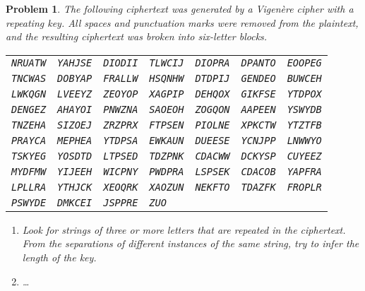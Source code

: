 \documentclass[12pt]{article}
\newtheorem{problem}{Problem}
\theoremstyle{remark}  %
\begin{document}
    \begin{problem}
    The following ciphertext was generated by a Vigenère cipher with a repeating key. All spaces and punctuation marks were removed from the plaintext, and the resulting ciphertext was broken into six-letter blocks.
    \begin{center}
        \begin{tabular}{lllllll}
            \texttt{NRUATW} & \texttt{YAHJSE} & \texttt{DIODII} & \texttt{TLWCIJ} & \texttt{DIOPRA} & \texttt{DPANTO} & \texttt{EOOPEG} \\
            \texttt{TNCWAS} & \texttt{DOBYAP} & \texttt{FRALLW} & \texttt{HSQNHW} & \texttt{DTDPIJ} & \texttt{GENDEO} & \texttt{BUWCEH} \\
            \texttt{LWKQGN} & \texttt{LVEEYZ} & \texttt{ZEOYOP} & \texttt{XAGPIP} & \texttt{DEHQOX} & \texttt{GIKFSE} & \texttt{YTDPOX} \\
            \texttt{DENGEZ} & \texttt{AHAYOI} & \texttt{PNWZNA} & \texttt{SAOEOH} & \texttt{ZOGQON} & \texttt{AAPEEN} & \texttt{YSWYDB} \\
            \texttt{TNZEHA} & \texttt{SIZOEJ} & \texttt{ZRZPRX} & \texttt{FTPSEN} & \texttt{PIOLNE} & \texttt{XPKCTW} & \texttt{YTZTFB} \\
            \texttt{PRAYCA} & \texttt{MEPHEA} & \texttt{YTDPSA} & \texttt{EWKAUN} & \texttt{DUEESE} & \texttt{YCNJPP} & \texttt{LNWWYO} \\
            \texttt{TSKYEG} & \texttt{YOSDTD} & \texttt{LTPSED} & \texttt{TDZPNK} & \texttt{CDACWW} & \texttt{DCKYSP} & \texttt{CUYEEZ} \\
            \texttt{MYDFMW} & \texttt{YIJEEH} & \texttt{WICPNY} & \texttt{PWDPRA} & \texttt{LSPSEK} & \texttt{CDACOB} & \texttt{YAPFRA} \\
            \texttt{LPLLRA} & \texttt{YTHJCK} & \texttt{XEOQRK} & \texttt{XAOZUN} & \texttt{NEKFTO} & \texttt{TDAZFK} & \texttt{FROPLR} \\
            \texttt{PSWYDE} & \texttt{DMKCEI} & \texttt{JSPPRE} & \texttt{ZUO} & \texttt{} & \texttt{} & \texttt{} \\
        \end{tabular}
    \end{center}
    \begin{enumerate}[label=(\alph*)]
        \item Look for strings of three or more letters that are repeated in the ciphertext. From the separations of different instances of the same string, try to infer the length of the key.
        \item \dots
    \end{enumerate}
    \end{problem}
\end{document}

